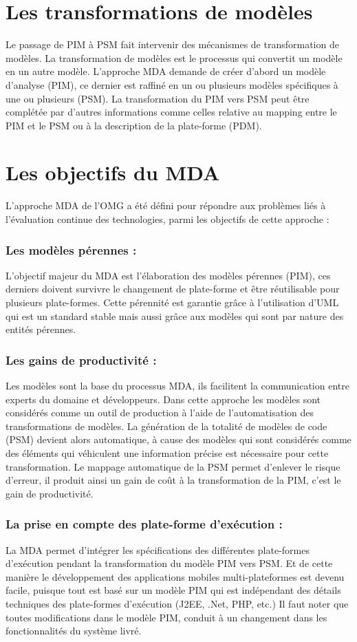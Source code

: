 \documentclass[
10pt, %
a4paper, %
oneside, %
headinclude,footinclude, %
BCOR5mm, %
]{report}
\begin{document}
		\section{Les transformations de modèles}
		Le passage de PIM à PSM fait intervenir des mécanismes de transformation de modèles. La transformation de modèles est le processus qui convertit un modèle en un autre modèle.
		L'approche  MDA demande de créer d'abord un modèle d’analyse (PIM), ce dernier est raffiné en un ou plusieurs modèles spécifiques à une ou plusieurs (PSM). 
    La transformation du PIM vers PSM peut être complétée par d’autres informations comme celles relative au mapping entre le PIM et le PSM ou à la description de la plate-forme (PDM).
    
				
    \section{Les objectifs du MDA }
    L’approche MDA de l’OMG a été défini pour répondre aux problèmes liés à l’évaluation continue des technologies, parmi les objectifs de cette approche : 
    \subsubsection{Les modèles pérennes :}
    L’objectif  majeur du MDA est l’élaboration des modèles pérennes (PIM), ces derniers doivent survivre le changement de plate-forme et être réutilisable pour plusieurs plate-formes.
        Cette  pérennité est garantie  grâce à l'utilisation d'UML qui est un standard stable mais aussi grâce  aux modèles qui sont par nature des entités pérennes.
    \subsubsection{Les gains de productivité :}
    Les modèles sont la base du processus MDA, ils facilitent la communication entre experts du domaine et développeurs. Dans cette approche les modèles sont considérés comme un  outil de production à l’aide de l'automatisation des transformations de modèles.
    La génération de la totalité de modèles de  code (PSM) devient alors automatique, à cause des modèles qui sont  considérés comme des  éléments qui véhiculent une information précise est nécessaire pour cette transformation. Le mappage automatique de la PSM permet  d'enlever le risque d'erreur, il produit ainsi un gain de coût à la transformation de la PIM, c’est le gain de productivité. 
    \subsubsection{La prise en compte des plate-forme d'exécution :}	
    La  MDA  permet d’intégrer  les spécifications des différentes plate-formes d'exécution pendant la transformation du modèle PIM vers PSM.  Et de cette manière le développement des applications mobiles multi-plateformes est devenu facile, puisque tout est basé sur un modèle PIM qui est indépendant des détails techniques des plate-formes d’exécution (J2EE, .Net, PHP, etc.)
    Il  faut  noter  que toutes  modifications  dans le  modèle PIM, conduit à un changement dans les fonctionnalités du système livré.
\end{document}
